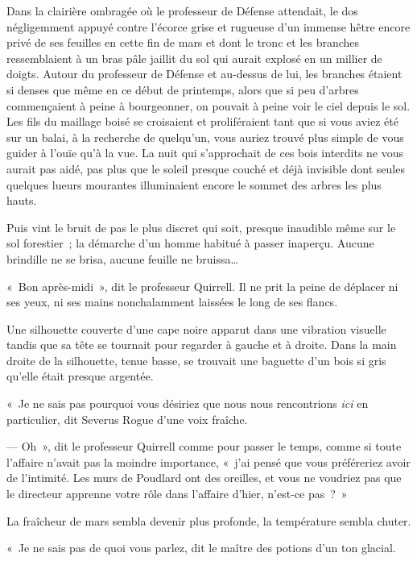 
Dans la clairière ombragée où le professeur de Défense attendait, le dos négligemment appuyé contre l'écorce grise et rugueuse d'un immense hêtre encore privé de ses feuilles en cette fin de mars et dont le tronc et les branches ressemblaient à un bras pâle jaillit du sol qui aurait explosé en un millier de doigts.
Autour du professeur de Défense et au-dessus de lui, les branches étaient si denses que même en ce début de printemps, alors que si peu d'arbres commençaient à peine à bourgeonner, on pouvait à peine voir le ciel depuis le sol.
Les fils du maillage boisé se croisaient et proliféraient tant que si vous aviez été sur un balai, à la recherche de quelqu'un, vous auriez trouvé plus simple de vous guider à l'ouïe qu'à la vue.
La nuit qui s'approchait de ces bois interdits ne vous aurait pas aidé, pas plus que le soleil presque couché et déjà invisible dont seules quelques lueurs mourantes illuminaient encore le sommet des arbres les plus hauts.

Puis vint le bruit de pas le plus discret qui soit, presque inaudible même sur le sol forestier~; la démarche d'un homme habitué à passer inaperçu.
Aucune brindille ne se brisa, aucune feuille ne bruissa…

«~Bon après-midi~», dit le professeur Quirrell.
Il ne prit la peine de déplacer ni ses yeux, ni ses mains nonchalamment laissées le long de ses flancs.

Une silhouette couverte d'une cape noire apparut dans une vibration visuelle tandis que sa tête se tournait pour regarder à gauche et à droite.
Dans la main droite de la silhouette, tenue basse, se trouvait une baguette d'un bois si gris qu'elle était presque argentée.

«~Je ne sais pas pourquoi vous désiriez que nous nous rencontrions \emph{ici} en particulier, dit Severus Rogue d'une voix fraîche.

--- Oh~», dit le professeur Quirrell comme pour passer le temps, comme si toute l'affaire n'avait pas la moindre importance, «~j'ai pensé que vous préféreriez avoir de l'intimité.
Les murs de Poudlard ont des oreilles, et vous ne voudriez pas que le directeur apprenne votre rôle dans l'affaire d'hier, n'est-ce pas~?~»

La fraîcheur de mars sembla devenir plus profonde, la température sembla chuter.

«~Je ne sais pas de quoi vous parlez, dit le maître des potions d'un ton glacial.

